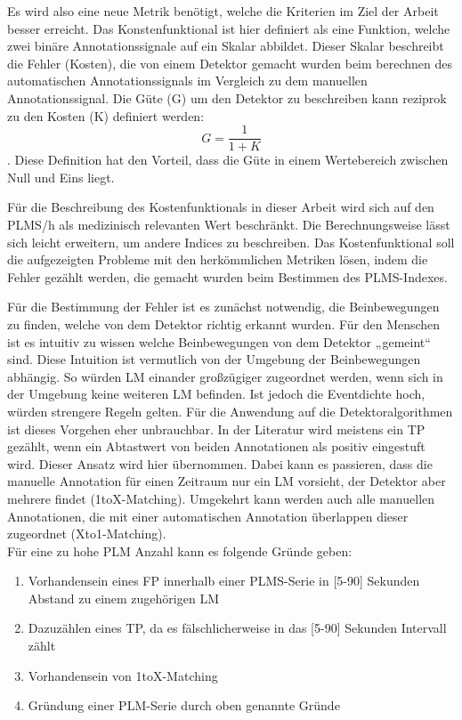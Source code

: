 Es wird also eine neue Metrik benötigt, welche die Kriterien im Ziel der Arbeit besser erreicht.
Das Konstenfunktional ist hier definiert als eine Funktion, welche zwei binäre Annotationssignale auf ein Skalar abbildet. Dieser Skalar beschreibt die Fehler (Kosten), die von einem Detektor gemacht wurden beim berechnen des automatischen Annotationssignals im Vergleich zu dem manuellen Annotationssignal.
Die Güte (G) um den Detektor zu beschreiben kann reziprok zu den Kosten (K) definiert werden: \begin{equation}
    G = \frac{1}{1+K}\label{Güte}
\end{equation}. Diese Definition hat den Vorteil, dass die Güte in einem Wertebereich zwischen Null und Eins liegt. 

Für die Beschreibung des Kostenfunktionals in dieser Arbeit wird sich auf den PLMS/h als medizinisch relevanten Wert beschränkt. Die Berechnungsweise lässt sich leicht erweitern, um andere Indices zu beschreiben.
Das Kostenfunktional soll die aufgezeigten Probleme mit den herkömmlichen Metriken lösen, indem die Fehler gezählt werden, die gemacht wurden beim Bestimmen des PLMS-Indexes. 


Für die Bestimmung der Fehler ist es zunächst notwendig, die Beinbewegungen zu finden, welche von dem Detektor richtig erkannt wurden. Für den Menschen ist es intuitiv zu wissen welche Beinbewegungen von dem Detektor „gemeint“ sind. Diese Intuition ist vermutlich von der Umgebung der Beinbewegungen abhängig. So würden LM einander großzügiger zugeordnet werden, wenn sich in der Umgebung keine weiteren LM befinden. Ist jedoch die Eventdichte hoch, würden strengere Regeln gelten. Für die Anwendung auf die Detektoralgorithmen ist dieses Vorgehen eher unbrauchbar. In der Literatur wird meistens ein TP gezählt, wenn ein Abtastwert von beiden Annotationen als positiv eingestuft wird. Dieser Ansatz wird hier übernommen.
Dabei kann es passieren, dass die manuelle Annotation für einen Zeitraum nur ein LM vorsieht, der Detektor aber mehrere findet (1toX-Matching). Umgekehrt kann werden auch alle manuellen Annotationen, die mit einer automatischen Annotation überlappen dieser zugeordnet (Xto1-Matching).
\\
 
\noindent Für eine zu hohe PLM Anzahl kann es folgende Gründe geben:



\begin{enumerate}
	\item Vorhandensein eines FP innerhalb einer PLMS-Serie in [5-90] Sekunden Abstand zu einem zugehörigen LM
	\item Dazuzählen eines TP, da es fälschlicherweise in das [5-90] Sekunden Intervall zählt
	\item Vorhandensein von 1toX-Matching
	\item Gründung einer PLM-Serie durch oben genannte Gründe
\end{enumerate}



